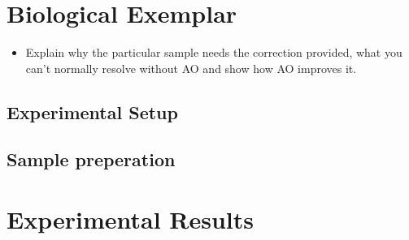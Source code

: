 \section{Biological Exemplar}
\label{sec:RF_biology}

	\begin{itemize}
		\item Explain why the particular sample needs the correction provided, what you can't normally resolve without AO and show how  AO improves it.
	\end{itemize}

	\subsection{Experimental Setup}
	\label{subsec:RF_setup}

	\subsection{Sample preperation}
	\label{subsec:RF_sample_prep}
	
\section{Experimental Results}
\label{sec:RF_results}
